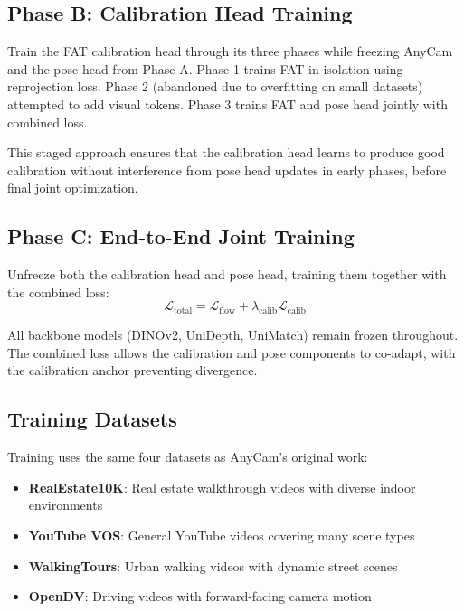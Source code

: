 \subsection{Phase B: Calibration Head Training}

Train the FAT calibration head through its three phases while freezing AnyCam and the pose head from Phase A. Phase 1 trains FAT in isolation using reprojection loss. Phase 2 (abandoned due to overfitting on small datasets) attempted to add visual tokens. Phase 3 trains FAT and pose head jointly with combined loss.

This staged approach ensures that the calibration head learns to produce good calibration without interference from pose head updates in early phases, before final joint optimization.

\subsection{Phase C: End-to-End Joint Training}

Unfreeze both the calibration head and pose head, training them together with the combined loss:
\begin{equation}
    \mathcal{L}_{\text{total}} = \mathcal{L}_{\text{flow}} + \lambda_{\text{calib}} \mathcal{L}_{\text{calib}}
\end{equation}

All backbone models (DINOv2, UniDepth, UniMatch) remain frozen throughout. The combined loss allows the calibration and pose components to co-adapt, with the calibration anchor preventing divergence.

\subsection{Training Datasets}

Training uses the same four datasets as AnyCam's original work:
\begin{itemize}
    \item \textbf{RealEstate10K}: Real estate walkthrough videos with diverse indoor environments
    \item \textbf{YouTube VOS}: General YouTube videos covering many scene types
    \item \textbf{WalkingTours}: Urban walking videos with dynamic street scenes
    \item \textbf{OpenDV}: Driving videos with forward-facing camera motion
\end{itemize}

